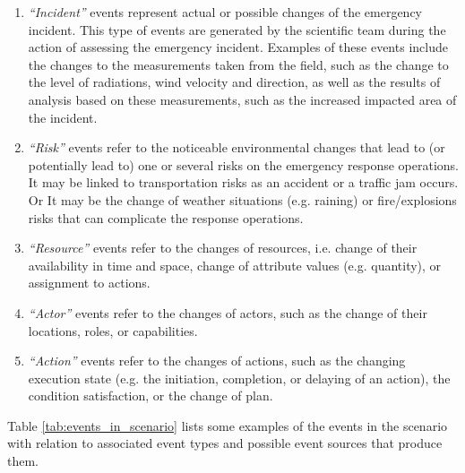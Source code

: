 \begin{enumerate}
 	\item \emph{``Incident''} events represent actual or possible changes of the emergency incident. This type of events are generated by the scientific team during the action of assessing the emergency incident. Examples of these events include the changes to the measurements taken from the field, such as the change to the level of radiations, wind velocity and direction, as well as the results of analysis based on these measurements, such as the increased impacted area of the incident. 
 	\item \emph{``Risk''} events refer to the noticeable environmental changes that lead to (or potentially lead to) one or several risks on the emergency response operations. It may be linked to transportation risks as an accident or a traffic jam occurs. Or It may be the change of weather situations (e.g. raining) or fire/explosions risks that can complicate the response operations. 
 	\item \emph{``Resource''} events refer to the changes of resources, i.e. change of their availability in time and space, change of attribute values (e.g. quantity), or assignment to actions.
 	\item \emph{``Actor''} events refer to the changes of actors, such as the change of their locations, roles, or capabilities.
 	\item \emph{``Action''} events refer to the changes of actions, such as the changing execution state (e.g. the initiation, completion, or delaying of an action), the condition satisfaction, or the change of plan. 
 \end{enumerate} 

Table \ref{tab:events_in_scenario} lists some examples of the events in the scenario with relation to associated event types and possible event sources that produce them.

